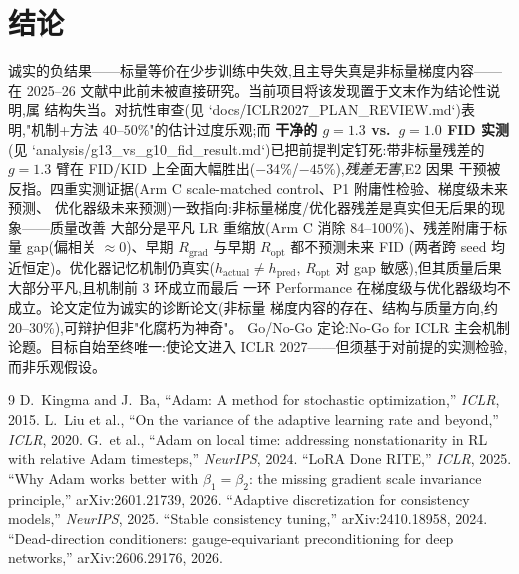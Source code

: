 \documentclass[UTF8,11pt,a4paper]{ctexart}
\begin{document}
\section{结论}
\label{sec:conclusion}

诚实的负结果——标量等价在少步训练中失效,且主导失真是非标量梯度内容——在
2025--26 文献中此前未被直接研究。当前项目将该发现置于文末作为结论性说明,属
结构失当。对抗性审查(见 `docs/ICLR2027\_PLAN\_REVIEW.md`)表明,"机制+方法
$40$--$50\%$"的估计过度乐观;而 \textbf{干净的 $g{=}1.3$ vs.\ $g{=}1.0$ FID 实测}
(见 `analysis/g13\_vs\_g10\_fid\_result.md`)已把前提判定钉死:带非标量残差的
$g{=}1.3$ 臂在 FID/KID 上全面大幅胜出($-34\%$/$-45\%$),\emph{残差无害},E2 因果
干预被反指。四重实测证据(Arm C scale-matched control、P1 附庸性检验、梯度级未来预测、
优化器级未来预测)一致指向:非标量梯度/优化器残差是真实但无后果的现象——质量改善
大部分是平凡 LR 重缩放(Arm C 消除 84--100\%)、残差附庸于标量 gap(偏相关
$\approx 0$)、早期 $R_{\mathrm{grad}}$ 与早期 $R_{\mathrm{opt}}$ 都不预测未来 FID
(两者跨 seed 均近恒定)。优化器记忆机制仍真实($h_{\mathrm{actual}}\neq h_{\mathrm{pred}}$,
$R_{\mathrm{opt}}$ 对 gap 敏感),但其质量后果大部分平凡,且机制前 3 环成立而最后
一环 Performance 在梯度级与优化器级均不成立。论文定位为诚实的诊断论文(非标量
梯度内容的存在、结构与质量方向,约 $20$--$30\%$),可辩护但非"化腐朽为神奇"。
Go/No-Go 定论:No-Go for ICLR 主会机制论题。目标自始至终唯一:使论文进入
ICLR 2027——但须基于对前提的实测检验,而非乐观假设。

\begin{thebibliography}{9}
   D.~Kingma and J.~Ba, ``Adam: A method for stochastic
  optimization,'' \emph{ICLR}, 2015.
   L.~Liu et al., ``On the variance of the adaptive learning
  rate and beyond,'' \emph{ICLR}, 2020.
   G.~et al., ``Adam on local time: addressing nonstationarity
  in RL with relative Adam timesteps,'' \emph{NeurIPS}, 2024.
   ``LoRA Done RITE,'' \emph{ICLR}, 2025.
   ``Why Adam works better with $\beta_1=\beta_2$: the missing
  gradient scale invariance principle,'' arXiv:2601.21739, 2026.
   ``Adaptive discretization for consistency models,''
  \emph{NeurIPS}, 2025.
   ``Stable consistency tuning,'' arXiv:2410.18958, 2024.
   ``Dead-direction conditioners: gauge-equivariant preconditioning
  for deep networks,'' arXiv:2606.29176, 2026.
\end{thebibliography}
\end{document}
